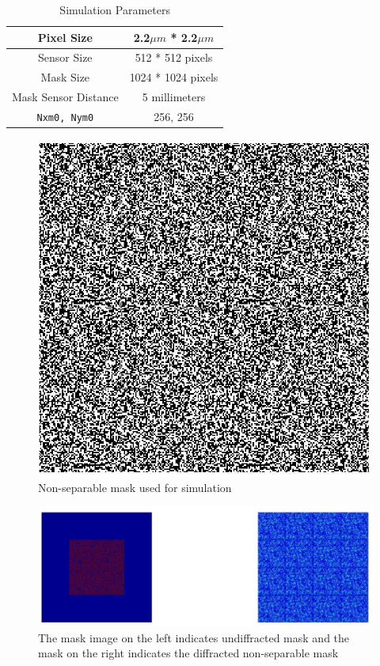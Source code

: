 \begin{table}
\label{tbl:sim_parameters}
\caption{Simulation Parameters}
\begin{center}
\begin{tabular}{ |c|c| }
\hline
Pixel Size & 2.2$\mu m$ * 2.2$\mu m$\\
\hline
Sensor Size & 512 * 512 pixels\\
\hline     
Mask Size & 1024 * 1024 pixels\\
\hline 
Mask Sensor Distance & 5 millimeters \\
\hline 
\texttt{Nxm0, Nym0} & 256, 256\\
\end{tabular}
\end{center}
\end{table}

\begin{figure}[ht]
\centering
\includegraphics[scale = 0.250]{pics/non_separable_mask}
\caption{Non-separable mask used for simulation}
\label{fig:non_sep_sim}
\end{figure}

\begin{figure}[ht]
\centering
\includegraphics[width = \textwidth]{pics/non_sep_diffracted_mask}
\caption{The mask image on the left indicates undiffracted mask and the mask on the right indicates the diffracted non-separable mask}
\label{fig:non_sep_sim_diff}
\end{figure}

